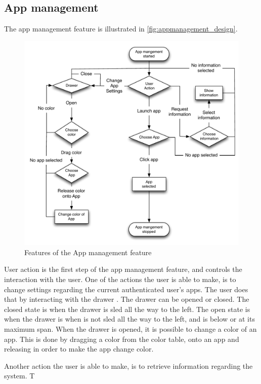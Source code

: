 \subsection{App management}
\label{design:app_manangement}
The app management feature is illustrated in \autoref{fig:appmanagement_design}. 
\begin{figure}[h]
	\centering
	\includegraphics[width=1\textwidth]{gfx/appmanagement.pdf}
	\caption{Features of the App management feature}
	\label{fig:appmanagement_design}
\end{figure}
User action is the first step of the app management feature, and controls the interaction with the user.
One of the actions the user is able to make, is to change settings regarding the current authenticated user's apps.
The user does that by interacting with the drawer .
The drawer can be opened or closed.
The closed state is when the drawer is sled all the way to the left.
The open state is when the drawer is when is not sled all the way to the left, and is below or at its maximum span.
When the drawer is opened, it is possible to change a color of an app.
This is done by dragging a color from the color table, onto an app and releasing in order to make the app change color.

Another action the user is able to make, is to retrieve information regarding the system. T
